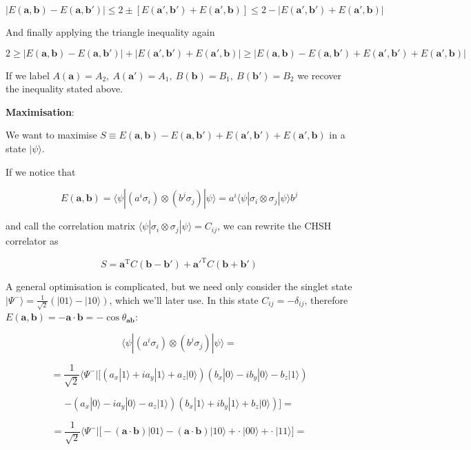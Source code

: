 \documentclass[11pt,dvipsnames]{article}
\begin{document}
$$
|E(\mathbf{a}, \mathbf{b}) - E(\mathbf{a}, \mathbf{b'})| \leq 
2 \pm [E(\mathbf{a'}, \mathbf{b'}) + E(\mathbf{a'}, \mathbf{b})] \leq
2 -   |E(\mathbf{a'}, \mathbf{b'}) + E(\mathbf{a'}, \mathbf{b})|
$$

And finally applying the triangle inequality again

$$
2 \geq |E(\mathbf{a}, \mathbf{b}) - E(\mathbf{a}, \mathbf{b'})| + 
|E(\mathbf{a'}, \mathbf{b'}) + E(\mathbf{a'}, \mathbf{b})| \geq
|E(\mathbf{a}, \mathbf{b}) -   E(\mathbf{a}, \mathbf{b'}) +
E(\mathbf{a'}, \mathbf{b'}) +  E(\mathbf{a'}, \mathbf{b})|
$$

If we label $A(\mathbf{a})=A_2,\ A(\mathbf{a'})=A_1,\ B(\mathbf{b})=B_1,\ B(\mathbf{b'})=B_2$ we recover the inequality stated above.

\textbf{Maximisation}:

We want to maximise $S \equiv E(\mathbf{a}, \mathbf{b}) - E(\mathbf{a}, \mathbf{b'}) +
E(\mathbf{a'}, \mathbf{b'}) + E(\mathbf{a'}, \mathbf{b})$ in a state $|\psi\rangle$.

If we notice that 

$$
E(\mathbf{a}, \mathbf{b}) = \langle\psi|(a^i\sigma_i)\otimes(b^j\sigma_j)|\psi\rangle = 
a^i\langle\psi|\sigma_i\otimes\sigma_j|\psi\rangle b^j
$$

and call the correlation matrix $\langle\psi|\sigma_i\otimes\sigma_j|\psi\rangle = C_{ij}$, we can rewrite the CHSH correlator as

$$
S = \mathbf{a}^\mathrm{T} C (\mathbf{b}-\mathbf{b'})+\mathbf{a'}^\mathrm{T} C (\mathbf{b}+\mathbf{b'})
$$

A general optimisation is complicated, but we need only consider the singlet state $|\Psi^-\rangle=\tfrac{1}{\sqrt{2}}(|01\rangle-|10\rangle)$, which we'll later use. In this state $C_{ij}=-\delta_{ij}$, therefore $E(\mathbf{a}, \mathbf{b})=-\mathbf{a}\cdot\mathbf{b}=-\cos\theta_{\mathbf{a}\mathbf{b}}$:


$$
\langle\psi|(a^i\sigma_i)\otimes(b^j\sigma_j)|\psi\rangle = 
$$

$$
= \frac{1}{\sqrt{2}}\langle\Psi^-| 
\bigg[(a_x|1\rangle+ia_y|1\rangle+a_z|0\rangle)(b_x|0\rangle-ib_y|0\rangle-b_z|1\rangle)
$$

$$
- (a_x|0\rangle-ia_y|0\rangle-a_z|1\rangle)(b_x|1\rangle+ib_y|1\rangle+b_z|0\rangle)\bigg] = 
$$

$$
=  \frac{1}{\sqrt{2}}\langle\Psi^-| 
\bigg[-(\mathbf{a}\cdot\mathbf{b})|01\rangle-(\mathbf{a}\cdot\mathbf{b})|10\rangle+ \cdot\ |00\rangle+\cdot\ |11\rangle\bigg] = 
$$
\end{document}
